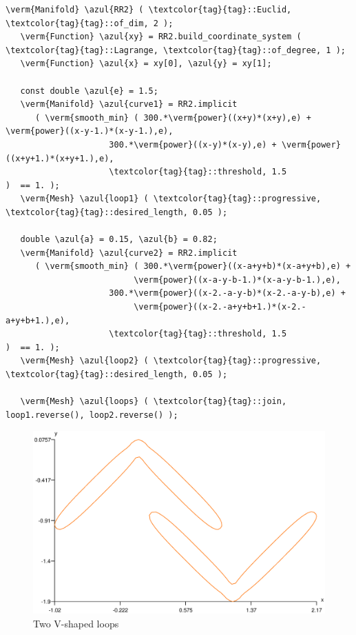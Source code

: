 \begin{Verbatim}[commandchars=\\\{\},formatcom=\small\tt,frame=single,
   rulecolor=\color{coment},baselinestretch=0.94,framesep=2mm         ]
   \verm{Manifold} \azul{RR2} ( \textcolor{tag}{tag}::Euclid, \textcolor{tag}{tag}::of_dim, 2 );
   \verm{Function} \azul{xy} = RR2.build_coordinate_system ( \textcolor{tag}{tag}::Lagrange, \textcolor{tag}{tag}::of_degree, 1 );
   \verm{Function} \azul{x} = xy[0], \azul{y} = xy[1];
   
   const double \azul{e} = 1.5;
   \verm{Manifold} \azul{curve1} = RR2.implicit 
      ( \verm{smooth_min} ( 300.*\verm{power}((x+y)*(x+y),e) + \verm{power}((x-y-1.)*(x-y-1.),e),
                     300.*\verm{power}((x-y)*(x-y),e) + \verm{power}((x+y+1.)*(x+y+1.),e),
                     \textcolor{tag}{tag}::threshold, 1.5                     )  == 1. );
   \verm{Mesh} \azul{loop1} ( \textcolor{tag}{tag}::progressive, \textcolor{tag}{tag}::desired_length, 0.05 );
      
   double \azul{a} = 0.15, \azul{b} = 0.82;
   \verm{Manifold} \azul{curve2} = RR2.implicit 
      ( \verm{smooth_min} ( 300.*\verm{power}((x-a+y+b)*(x-a+y+b),e) +
                          \verm{power}((x-a-y-b-1.)*(x-a-y-b-1.),e),
                     300.*\verm{power}((x-2.-a-y-b)*(x-2.-a-y-b),e) +
                          \verm{power}((x-2.-a+y+b+1.)*(x-2.-a+y+b+1.),e),
                     \textcolor{tag}{tag}::threshold, 1.5                           )  == 1. );
   \verm{Mesh} \azul{loop2} ( \textcolor{tag}{tag}::progressive, \textcolor{tag}{tag}::desired_length, 0.05 );

   \verm{Mesh} \azul{loops} ( \textcolor{tag}{tag}::join, loop1.reverse(), loop2.reverse() );                     
\end{Verbatim}

\begin{figure}[ht] \centering
  \includegraphics[width=130mm]{boomerang-1.eps}
  \caption{Two V-shaped loops}
  \label{\numb section 7.\numb fig 12}
\end{figure}

